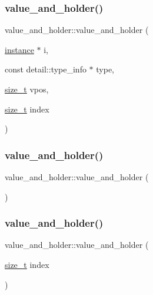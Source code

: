 \subsubsection{\texorpdfstring{value\_and\_holder()}{value\_and\_holder()}\hspace{0.1cm}{\footnotesize\ttfamily [1/3]}}
{\footnotesize\ttfamily value\+\_\+and\+\_\+holder\+::value\+\_\+and\+\_\+holder (\begin{DoxyParamCaption}\item[{\mbox{\hyperlink{structinstance}{instance}} $\ast$}]{i,  }\item[{const detail\+::type\+\_\+info $\ast$}]{type,  }\item[{\mbox{\hyperlink{detail_2common_8h_a801d6a451a01953ef8cbae6feb6a3638}{size\+\_\+t}}}]{vpos,  }\item[{\mbox{\hyperlink{detail_2common_8h_a801d6a451a01953ef8cbae6feb6a3638}{size\+\_\+t}}}]{index }\end{DoxyParamCaption})\hspace{0.3cm}{\ttfamily [inline]}}

\mbox{\label{structvalue__and__holder_a45b5891a7f3f38521afa8efaec497793}} 
\subsubsection{\texorpdfstring{value\_and\_holder()}{value\_and\_holder()}\hspace{0.1cm}{\footnotesize\ttfamily [2/3]}}
{\footnotesize\ttfamily value\+\_\+and\+\_\+holder\+::value\+\_\+and\+\_\+holder (\begin{DoxyParamCaption}{ }\end{DoxyParamCaption})\hspace{0.3cm}{\ttfamily [inline]}}

\mbox{\label{structvalue__and__holder_a01d2d216cf167e3c03f668e5723ce0bf}} 
\subsubsection{\texorpdfstring{value\_and\_holder()}{value\_and\_holder()}\hspace{0.1cm}{\footnotesize\ttfamily [3/3]}}
{\footnotesize\ttfamily value\+\_\+and\+\_\+holder\+::value\+\_\+and\+\_\+holder (\begin{DoxyParamCaption}\item[{\mbox{\hyperlink{detail_2common_8h_a801d6a451a01953ef8cbae6feb6a3638}{size\+\_\+t}}}]{index }\end{DoxyParamCaption})\hspace{0.3cm}{\ttfamily [inline]}}



